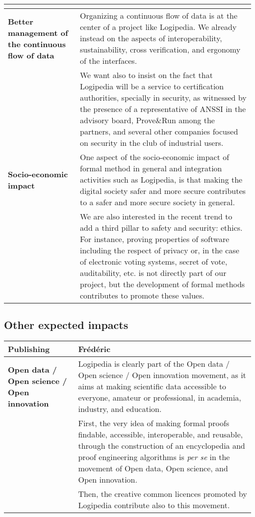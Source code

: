 \begin{longtable}{|p{}|p{}|}
\begin{framed}
\begin{compactitem}
\end{compactitem}


\end{framed}\\
\hline
    {\bf Better management of the continuous flow of data}
    &
Organizing a continuous flow of data is at the center of a project
like Logipedia. We already instead on the aspects of interoperability,
sustainability, cross verification, and ergonomy of the interfaces.\\

&
\hspace{0.4cm}
We want also to insist on the fact that Logipedia will be a service to
certification authorities, specially in security, as witnessed by the
presence of a representative of ANSSI in the advisory board,
Prove\&Run among the partners, and several other companies focused on
security in the club of industrial users.\\
\hline
{\bf Socio-economic impact}
&
One aspect of the socio-economic impact of formal method in general
and integration activities such as Logipedia, is that making the 
digital society safer and more secure contributes to a safer and more 
secure society in general.\\

&
\hspace{0.4cm} We are also interested in the recent trend to add a
third pillar to safety and security: ethics. For instance, proving
properties of software including the respect of privacy or, in the
case of electronic voting systems, secret of vote, auditability, etc.
is not directly part of our project, but the development of formal
methods contributes to promote these values.\\
\hline
\end{longtable}


\subsection{Other expected impacts}

\begin{longtable}{|p{}|p{}|}
\hline
{\bf Publishing}
&
{\color{red} Frédéric}\\
\hline
{\bf Open data / Open science / Open innovation}
&
Logipedia is clearly part of the Open data / Open science / Open
innovation movement, as it aims at making scientific data accessible
to everyone, amateur or professional, in academia, industry, and
education.\\
&
\hspace{0.4cm}
First, the very idea of making formal proofs findable, accessible,
interoperable, and reusable, through the construction of an
encyclopedia and proof engineering algorithms is {\em per se} in the
movement of Open data, Open science, and Open innovation.\\
&
\hspace{0.4cm}
Then, the creative common licences promoted by Logipedia contribute
also to this movement.\\
\hline
\end{longtable}


